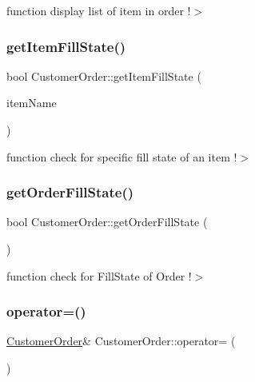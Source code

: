 function display list of item in order !$>$ \mbox{\label{class_customer_order_acf9c99fcd0b8899c75626c00ad207083}} 
\subsubsection{\texorpdfstring{get\+Item\+Fill\+State()}{getItemFillState()}}
{\footnotesize\ttfamily bool Customer\+Order\+::get\+Item\+Fill\+State (\begin{DoxyParamCaption}\item[{std\+::string}]{item\+Name }\end{DoxyParamCaption})}

function check for specific fill state of an item !$>$ \mbox{\label{class_customer_order_a36aede6a3339abdd2f476119dea55cf4}} 
\subsubsection{\texorpdfstring{get\+Order\+Fill\+State()}{getOrderFillState()}}
{\footnotesize\ttfamily bool Customer\+Order\+::get\+Order\+Fill\+State (\begin{DoxyParamCaption}{ }\end{DoxyParamCaption})}

function check for Fill\+State of Order !$>$ \mbox{\label{class_customer_order_a1a83b197a0ca27da950b7321273c46a5}} 
\subsubsection{\texorpdfstring{operator=()}{operator=()}\hspace{0.1cm}{\footnotesize\ttfamily [1/2]}}
{\footnotesize\ttfamily \mbox{\hyperlink{class_customer_order}{Customer\+Order}}\& Customer\+Order\+::operator= (\begin{DoxyParamCaption}\item[{\mbox{\hyperlink{class_customer_order}{Customer\+Order}} \&}]{ }\end{DoxyParamCaption})\hspace{0.3cm}{\ttfamily [delete]}}

